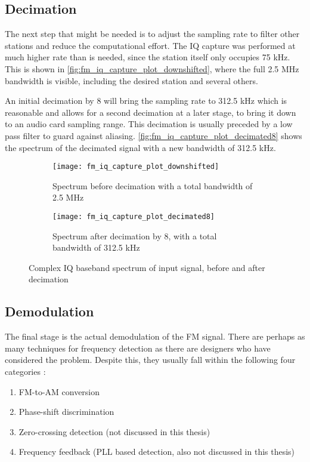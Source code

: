 \subsection{Decimation}

The next step that might be needed is to adjust the sampling rate to filter other stations and reduce the computational effort. The IQ capture was performed at much higher rate than is needed, since the station itself only occupies 75 kHz. This is shown in \autoref{fig:fm_iq_capture_plot_downshifted}, where the full 2.5 MHz bandwidth is visible, including the desired station and several others.

An initial decimation by 8 will bring the sampling rate to 312.5 kHz which is reasonable and allows for a second decimation at a later stage, to bring it down to an audio card sampling range. This decimation is usually preceded by a low pass filter to guard against aliasing. \autoref{fig:fm_iq_capture_plot_decimated8} shows the spectrum of the decimated signal with a new bandwidth of 312.5 kHz.

\begin{figure} [H]
  \begin{subfigure}{.5\textwidth}
    \centering
    \texttt{[image: fm\_iq\_capture\_plot\_downshifted]}
    \caption{Spectrum before decimation with a total bandwidth of 2.5 MHz}
    \label{fig:fm_iq_capture_plot_downshifted}
  \end{subfigure}%
  \begin{subfigure}{.5\textwidth}
    \centering
    \texttt{[image: fm\_iq\_capture\_plot\_decimated8]}
    \caption{Spectrum after decimation by 8, with a total bandwidth of 312.5 kHz}
    \label{fig:fm_iq_capture_plot_decimated8}
  \end{subfigure}
  \caption{Complex IQ baseband spectrum of input signal, before and after decimation}
\end{figure}

\subsection{Demodulation} \label{sect:fm_demodulation}

The final stage is the actual demodulation of the FM signal. There are perhaps as many techniques for frequency detection as there are designers who have considered the problem. Despite this, they usually fall within the following four categories \cite{communication_systems_carlson}:
\begin{enumerate}
  \item FM-to-AM conversion
  \item Phase-shift discrimination
  \item Zero-crossing detection (not discussed in this thesis)
  \item Frequency feedback (PLL based detection, also not discussed in this thesis)
\end{enumerate}

